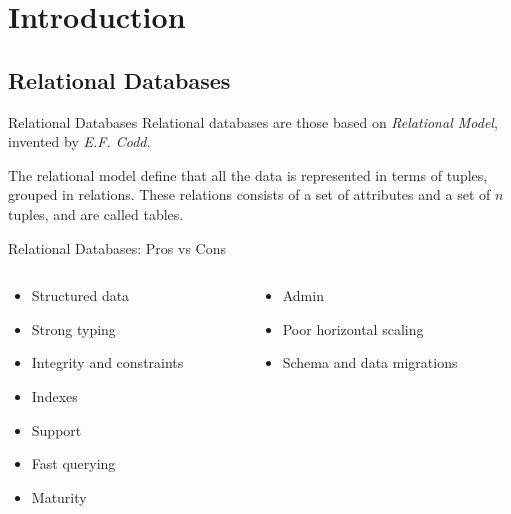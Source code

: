 \section{Introduction}
\subsection{Relational Databases}
\begin{frame}{Relational Databases}
    Relational databases are those based on \emph{Relational Model}, invented by \emph{E.F. Codd}.
    
    The relational model define that all the data is represented in terms of \alert{tuples}, grouped in \alert{relations}. These relations consists of a set of attributes and a set of $n$ tuples, and are called \alert{tables}.
\end{frame}
\begin{frame}{Relational Databases: Pros vs Cons}
    \begin{columns}[t]
        \begin{column}{.5\textwidth}
            \begin{exampleblock}{\huge\faThumbsOUp}
                \begin{itemize}
                    \item Structured data
                    \item Strong typing
                    \item Integrity and constraints
                    \item Indexes
                    \item Support
                    \item Fast querying
                    \item Maturity
                \end{itemize}
            \end{exampleblock}
        \end{column}
        \begin{column}{.5\textwidth}
            \begin{alertblock}{\huge\faThumbsODown}
                \begin{itemize}
                    \item Admin
                    \item Poor horizontal scaling
                    \item Schema and data migrations
                \end{itemize}
            \end{alertblock}
        \end{column}
    \end{columns}
\end{frame}

